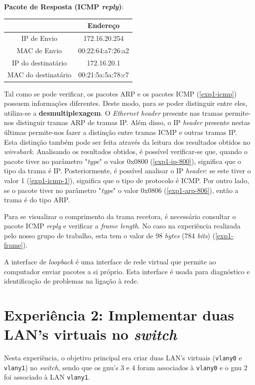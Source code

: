 \documentclass[article, a4paper, 11pt, oneside]{memoir}
\begin{document}
\textbf{Pacote de Resposta (ICMP \textit{reply})}:

\begin{tabular}{||c c||} 
  \hline
    & Endereço \\ [0.5ex] 
  \hline\hline
  IP de Envio & 172.16.20.254  \\ 
  \hline
  MAC de Envio & 00:22:64:a7:26:a2 \\
  \hline
  IP do destinatário & 172.16.20.1 \\
  \hline
  MAC do destinatário & 00:21:5a:5a:78:c7 \\ [1ex] 
  \hline
\end{tabular}

Tal como se pode verificar, os pacotes ARP e os pacotes ICMP (\ref{exp1-icmp}) possuem informações
diferentes. Deste modo, para se poder distinguir entre eles, utiliza-se a \textbf{desmultiplexagem}.
O \textit{Ethernet header} presente nas tramas permite-nos distinguir tramas ARP de tramas IP.
Além disso, o IP \textit{header} presente nestas últimas permite-nos fazer a
distinção entre tramas ICMP e outras tramas IP. Esta distinção também pode ser feita através da leitura
dos resultados obtidos no \textit{wireshark}.
Analisando os resultados obtidos, é possível verificar-se que, quando o pacote tiver no
parâmetro "\textit{type}" o valor 0x0800 (\ref{exp1-ip-800}), significa que o tipo da trama é IP.
Posteriormente, é possível analisar o IP \textit{header}: se este tiver o valor 1 (\ref{exp1-icmp-1}),
significa que o tipo de protocolo é ICMP. Por outro lado, se o pacote tiver no parâmetro
"\textit{type}" o valor 0x0806 (\ref{exp1-arp-806}), então a trama é do tipo ARP.

Para se visualizar o comprimento da trama recetora, é necessário consultar o pacote
ICMP \textit{reply} e verificar a \textit{frame length}. No caso na experiência realizada
pelo nosso grupo de trabalho, esta tem o valor de 98 \textit{bytes}
(784 \textit{bits}) (\ref{exp1-frame}).

A interface de \textit{loopback} é uma interface de rede virtual que permite ao computador enviar pacotes
a si próprio. Esta interface é usada para diagnóstico e identificação de problemas na ligação à rede.

\section{\textbf{Experiência 2}: Implementar duas LAN's virtuais no \textit{switch}}

Nesta experiência, o objetivo principal era criar duas LAN's virtuais (\verb|vlany0| e \verb|vlany1|)
no \textit{switch}, sendo que os gnu's 3 e 4 foram associados à \verb|vlany0| e o gnu 2 foi 
associado à LAN \verb|vlany1|.
\end{document}
